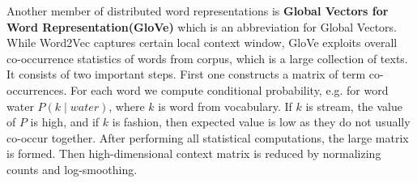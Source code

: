 Another member of distributed word representations is \textbf{Global Vectors for Word Representation(GloVe)} which is an abbreviation for Global Vectors. While Word2Vec captures certain local context window, GloVe exploits overall co-occurrence statistics of words from corpus, which is a large collection of texts. It consists of two important steps. First one constructs a matrix of term co-occurrences. For each word we compute conditional probability, e.g. for word water $ P(k\mid water) $, where $ k $ is word from vocabulary. If $ k $ is stream, the value of $ P $ is high, and if $ k $ is fashion, then expected value is low as they do not usually co-occur together. After performing all statistical computations, the large matrix is formed. Then high-dimensional context matrix is reduced by normalizing counts and log-smoothing.
